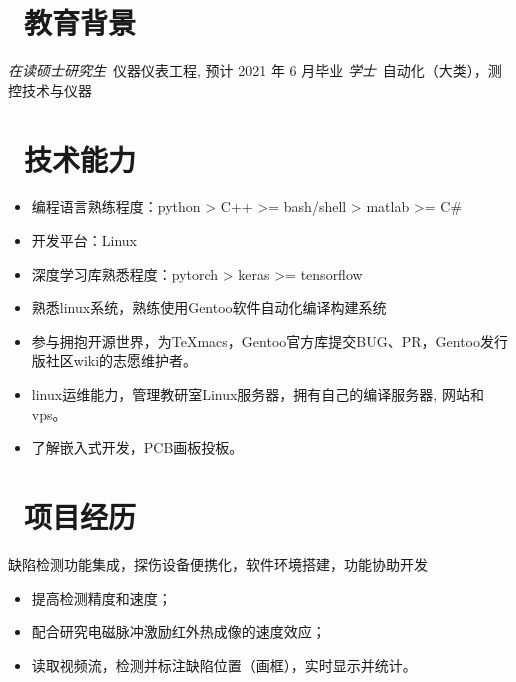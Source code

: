 \documentclass{resume}
\begin{document}


 
\section{\faGraduationCap\  教育背景}
\textit{在读硕士研究生}\ 仪器仪表工程, 预计 2021 年 6 月毕业
\textit{学士}\ 自动化（大类），测控技术与仪器

\section{\faCogs\ 技术能力}
\begin{itemize}[parsep=0.5ex]
  \item 编程语言熟练程度：python > C++ >= bash/shell > matlab >= C\#
  \item 开发平台：Linux 
  \item 深度学习库熟悉程度：pytorch > keras >= tensorflow
  \item 熟悉linux系统，熟练使用Gentoo软件自动化编译构建系统
  \item 参与拥抱开源世界，为TeXmacs，Gentoo官方库提交BUG、PR，Gentoo发行版社区wiki的志愿维护者。
  \item linux运维能力，管理教研室Linux服务器，拥有自己的编译服务器, 网站和vps。
  \item 了解嵌入式开发，PCB画板投板。
\end{itemize}


\section{\faUsers\ 项目经历}
缺陷检测功能集成，探伤设备便携化，软件环境搭建，功能协助开发
\begin{itemize}
  \item 提高检测精度和速度；
  \item 配合研究电磁脉冲激励红外热成像的速度效应；
  \item 读取视频流，检测并标注缺陷位置（画框），实时显示并统计。
\end{itemize}
\end{document}

